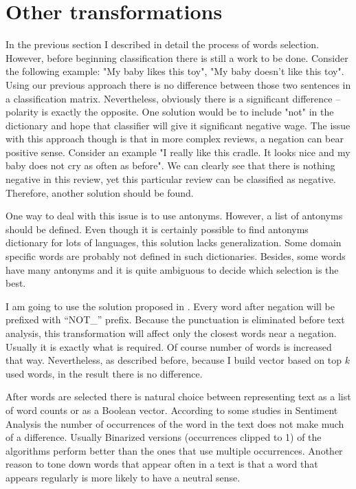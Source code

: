 \documentclass[12pt]{report}
\begin{document}
\newpage

\section{Other transformations}

In the previous section I described in detail the process of words selection.
However, before beginning classification there is still a work to be done. Consider the following example: "My baby likes this toy", "My baby doesn't like this toy". Using our previous approach there is no difference between those two sentences in a classification matrix. Nevertheless, obviously there is a significant difference – polarity is exactly the opposite. One solution would be to include "not" in the dictionary and hope that classifier will give it significant negative wage. The issue with this approach though is that in more complex reviews, a negation can bear positive sense. Consider an example "I really like this cradle. It looks nice and my baby does not cry as often as before". We can clearly see that there is nothing negative in this review, yet this particular review can be classified as negative. Therefore, another solution should be found.

One way to deal with this issue is to use antonyms. However, a list of antonyms should be defined. Even though it is certainly possible to find antonyms dictionary for lots of languages, this solution lacks generalization. Some domain specific words are probably not defined in such dictionaries. Besides, some words have many antonyms and it is quite ambiguous to decide which selection is the best.

I am going to use the solution proposed in \cite{Wake}. Every word after negation will be prefixed with “NOT\_” prefix. Because the punctuation is eliminated before text analysis, this transformation will affect only the closest words near a negation. Usually it is exactly what is required. Of course number of words is increased that way. Nevertheless, as described before, because I build vector based on top $k$ used words, in the result there is no difference.

After words are selected there is natural choice between representing text as a list of word counts or as a Boolean vector. According to some studies in Sentiment Analysis the number of occurrences of the word in the text does not make much of a difference. Usually Binarized versions (occurrences clipped to 1) of the algorithms perform better than the ones that use multiple occurrences.
Another reason to tone down words that appear often in a text is that a word that appears regularly is more likely to have a neutral sense.
\end{document}
